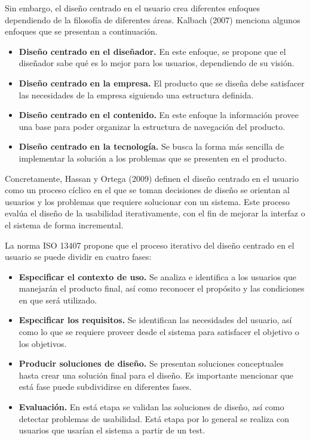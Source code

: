Sin embargo, el diseño centrado en el usuario crea diferentes enfoques dependiendo de la filosofía de diferentes áreas. Kalbach (2007) menciona algunos enfoques que se presentan a continuación.

\begin{itemize}
  \item \textbf{Diseño centrado en el diseñador.} En este enfoque, se propone que el diseñador sabe qué es lo mejor para los usuarios, dependiendo de su visión.
  \item \textbf{Diseño centrado en la empresa.} El producto que se diseña debe satisfacer las necesidades de la empresa siguiendo una estructura definida.
  \item \textbf{Diseño centrado en el contenido.} En este enfoque la información provee una base para poder organizar la estructura de navegación del producto.
  \item \textbf{Diseño centrado en la tecnología.} Se busca la forma más sencilla de implementar la solución a los problemas que se presenten en el producto.
\end{itemize}

Concretamente, Hassan y Ortega (2009) definen el diseño centrado en el usuario como un proceso cíclico en el que se toman decisiones de diseño se orientan al usuarios y los problemas que requiere solucionar con un sistema. Este proceso evalúa el diseño de la usabilidad iterativamente, con el fin de mejorar la interfaz o el sistema de forma incremental.

La norma ISO 13407 propone que el proceso iterativo del diseño centrado en el usuario se puede dividir en cuatro fases:

\begin{itemize}
  \item \textbf{Especificar el contexto de uso.} Se analiza e identifica a los usuarios que manejarán el producto final, así como reconocer el propósito y las condiciones en que será utilizado.
  \item \textbf{Especificar los requisitos.} Se identifican las necesidades del usuario, así como lo que se requiere proveer desde el sistema para satisfacer el objetivo o los objetivos.
  \item \textbf{Producir soluciones de diseño.} Se presentan soluciones conceptuales hasta crear una solución final para el diseño. Es importante mencionar que está fase puede subdividirse en diferentes fases.
  \item \textbf{Evaluación.} En está etapa se validan las soluciones de diseño, así como detectar problemas de usabilidad. Está etapa por lo general se realiza con usuarios que usarían el sistema a partir de un test.
\end{itemize}

